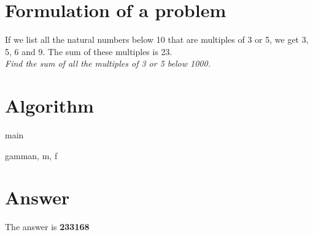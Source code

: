 \documentclass[12pt]{article}
\begin{document}
\maketitle

\section{Formulation of a problem}
If we list all the natural numbers below 10 that are multiples of 3 or 5, we
get 3, 5, 6 and 9. The sum of these multiples is 23. \\
\emph{Find the sum of all the multiples of 3 or 5 below 1000.}

\section{Algorithm}
\begin{eqcode}{main}{\ }{\ }{}
   \lend
\end{eqcode}

\begin{eqcode}{gamma}{n, m}{, }{}
  f \gets \left \lfloor  {} \right \rfloor \lend
   \lend
\end{eqcode}

\section{Answer}
  The answer is \bf{233168}
\end{document}
